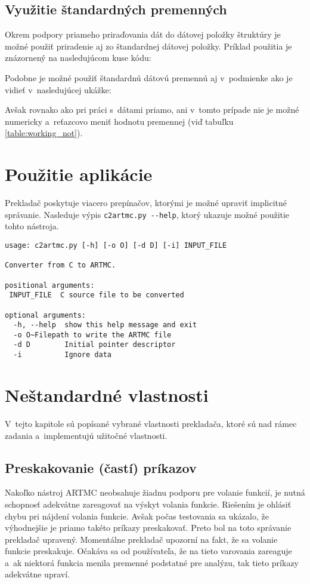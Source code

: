 \subsection{Využitie štandardných premenných}
Okrem podpory priameho priraďovania dát do dátovej položky štruktúry je možné použiť priradenie aj zo štandardnej dátovej položky. Príklad použitia je znázornený na nasledujúcom kuse kódu:


\noindent
Podobne je možné použiť štandardnú dátovú premennú aj v~podmienke ako je vidieť v~nasledujúcej ukážke:


\noindent
Avšak rovnako ako pri práci s~dátami priamo, ani v~tomto prípade nie je možné numericky a~reťazcovo meniť hodnotu premennej (viď tabuľku \ref{table:working_not}).

\section{Použitie aplikácie}
Prekladač poskytuje viacero prepínačov, ktorými je možné upraviť implicitné správanie.  Nasleduje výpis \texttt{c2artmc.py -{}-help}, ktorý ukazuje možné použitie tohto nástroja.
\begin{verbatim}
usage: c2artmc.py [-h] [-o O] [-d D] [-i] INPUT_FILE

Converter from C to ARTMC.

positional arguments:
 INPUT_FILE  C source file to be converted

optional arguments:
  -h, --help  show this help message and exit
  -o O~Filepath to write the ARTMC file
  -d D        Initial pointer descriptor
  -i          Ignore data
\end{verbatim}

\section{Neštandardné vlastnosti}
\label{sec_features}
V~tejto kapitole sú popísané vybrané vlastnosti prekladača, ktoré sú nad rámec zadania a~implementujú užitočné vlastnosti.
\subsection{Preskakovanie (častí) príkazov}
\label{sec_features_jump}
Nakoľko nástroj ARTMC neobsahuje žiadnu podporu pre volanie funkcií, je nutná schopnosť adekvátne zareagovať na výskyt volania funkcie. Riešením je ohlásiť chybu pri nájdení volania funkcie. Avšak počas testovania sa ukázalo, že výhodnejšie je priamo takéto príkazy preskakovať. Preto bol na toto správanie prekladač upravený. Momentálne prekladač upozorní na fakt, že sa volanie funkcie preskakuje. Očakáva sa od používateľa, že na tieto varovania zareaguje a~ak niektorá funkcia menila premenné podstatné pre analýzu, tak tieto príkazy adekvátne upraví.

